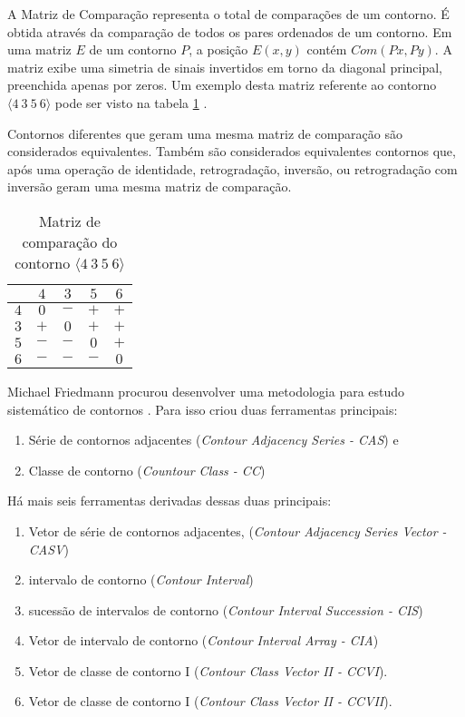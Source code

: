 \documentclass[12pt,brazil]{book}
\newcommand{\eng}[1]{\textit{#1}}
\begin{document}
A Matriz de Comparação representa o total de comparações de um
contorno. É obtida através da comparação de todos os pares ordenados
de um contorno. Em uma matriz $E$ de um contorno $P$, a posição $E
(x,y)$ contém $Com (Px,Py)$. A matriz exibe uma simetria de sinais
invertidos em torno da diagonal principal, preenchida apenas por
zeros. Um exemplo desta matriz referente ao contorno $\langle
4\:3\:5\:6 \rangle$ pode ser visto na tabela \ref{tab:matriz-4356}
\cite[p. 28]{morris87:composition}.

Contornos diferentes que geram uma mesma matriz de comparação
são considerados equivalentes. Também são considerados equivalentes
contornos que, após uma operação de identidade, retrogradação,
inversão, ou retrogradação com inversão geram uma mesma matriz de
comparação.

\begin{table}
  \centering
  \begin{tabular}{r|cccc}
    & $4$ & $3$ & $5$ & $6$ \\
    \hline
    $4$ & $0$ & $-$ & $+$ & $+$ \\
    $3$ & $+$ & $0$ & $+$ & $+$ \\
    $5$ & $-$ & $-$ & $0$ & $+$ \\
    $6$ & $-$ & $-$ & $-$ & $0$ \\
  \end{tabular}
  \caption{Matriz de comparação do contorno $\langle 4\:3\:5\:6 \rangle$}
\label{tab:matriz-4356}
\end{table}

Michael Friedmann procurou desenvolver uma metodologia para estudo
sistemático de contornos \cite{friedmann85:methodology}. Para isso
criou duas ferramentas principais:

\begin{enumerate}
\item Série de contornos adjacentes (\eng{Contour Adjacency Series -
    CAS}) e
\item Classe de contorno (\eng{Countour Class - CC})
\end{enumerate}

Há mais seis ferramentas derivadas dessas duas principais:

\begin{enumerate}
\item Vetor de série de contornos adjacentes, (\eng{Contour Adjacency
    Series Vector - CASV})
\item intervalo de contorno (\eng{Contour Interval})
\item sucessão de intervalos de contorno (\eng{Contour Interval
    Succession - CIS})
\item Vetor de intervalo de contorno (\eng{Contour Interval Array -
    CIA})
\item Vetor de classe de contorno I (\eng{Contour Class Vector II -
    CCVI}).
\item Vetor de classe de contorno I (\eng{Contour Class Vector II -
    CCVII}).
\end{enumerate}
\end{document}

